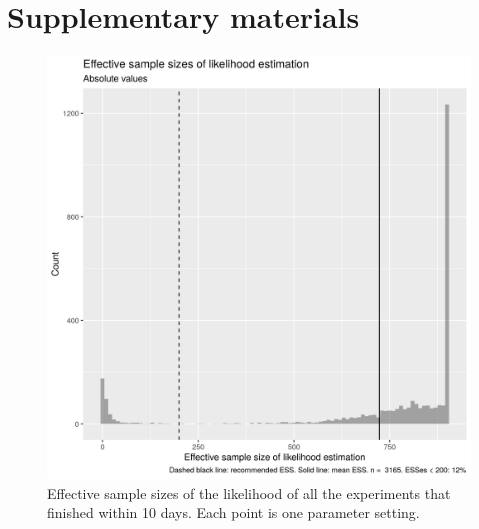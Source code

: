 \section{Supplementary materials}

\begin{figure}[!htbp]
  \includegraphics[width=\textwidth]{20200204_fig_esses.png}
  \caption{
    Effective sample sizes of the likelihood of all the experiments that
    finished within 10 days. 
    Each point is one parameter setting.
  }
  \label{fig:esses}
\end{figure}

